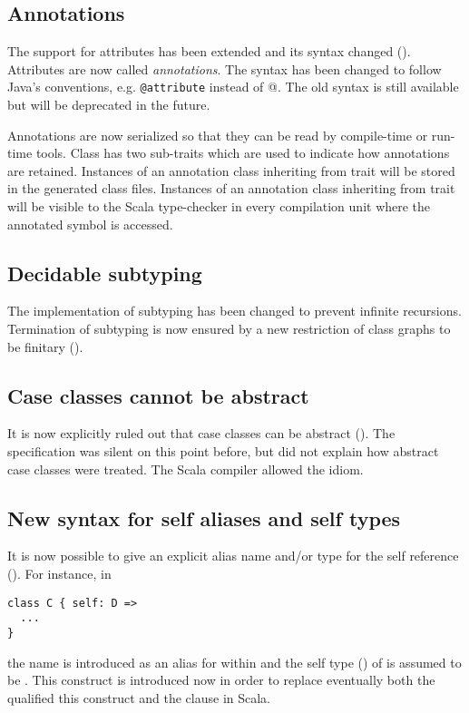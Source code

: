 \subsection*{Annotations}

The support for attributes has been extended and its syntax changed
().  Attributes are now called {\em
  annotations}. The syntax has been changed to follow Java's
conventions, e.g. \lstinline^@attribute^ instead of
\lstinline@[attribute]@. The old syntax is still available but will be
deprecated in the future.

Annotations are now serialized so that they can be read by
compile-time or run-time tools. Class  has two
sub-traits which are used to indicate how annotations are
retained. Instances of an annotation class inheriting from trait
 will be stored in the generated class
files. Instances of an annotation class inheriting from trait
 will be visible to the Scala type-checker
in every compilation unit where the annotated symbol is accessed. 

\subsection*{Decidable subtyping}

The implementation of subtyping has been changed to prevent infinite
recursions. Termination of subtyping is now ensured by a new
restriction of class graphs to be finitary
().

\subsection*{Case classes cannot be abstract}

It is now explicitly ruled out that case classes can be abstract
(). The specification was silent on this point
before, but did not explain how abstract case classes were
treated. The Scala compiler allowed the idiom.

\subsection*{New syntax for self aliases and self types}

It is now possible to give an explicit alias name and/or type for the
self reference  (). For instance, in
\begin{lstlisting}
class C { self: D => 
  ...
}
\end{lstlisting}
the name  is introduced as an alias for  within
 and the self type () of  is
assumed to be . This construct is introduced now in order to
replace eventually both the qualified this construct  and
the  clause in Scala.

